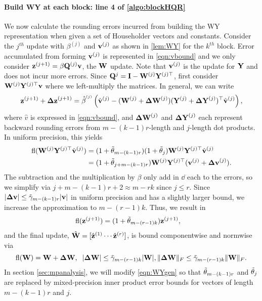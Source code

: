 \paragraph{Build WY at each block: line 4 of \cref{algo:blockHQR}}
We now calculate the rounding errors incurred from building the WY representation when given a set of Householder vectors and constants. 
Consider the $j^{th}$ update with $\beta^{(j)}$ and $\mathbf{v}^{(j)}$ as shown in \cref{lem:WY} for the $k^{th}$ block.
Error accumulated from forming $\mathbf{v}^{(j)}$ is represented in \cref{eqn:vbound} and we only consider $\mathbf{z}^{(j+1)} =\beta\mathbf{Q}^{(j)}\mathbf{v}$, the $
\mathbf{W}$ update.
Note that $\mathbf{v}^{(j)}$ is the update for $\mathbf{Y}$ and does not incur more errors. 
Since $\mathbf{Q}^{j} = \mathbf{I} - \mathbf{W}^{(j)}\mathbf{Y}^{(j)\top}$, first consider $\mathbf{W}^{(j)}\mathbf{Y}^{(j)\top}\mathbf{v}$ where we left-multiply the matrices.
In general, we can write
\begin{equation*}
\mathbf{z}^{(j+1)} + \mathbf{\Delta z}^{(j+1)} = \hat{\beta}^{^{(j)}}\left( \hat{\mathbf{v}}^{(j)} - (\mathbf{W}^{(j)} + \mathbf{\Delta W}^{(j)})(\mathbf{Y}^{(j)}+\mathbf{\Delta Y}^{(j)})^{\top}\hat{\mathbf{v}}^{(j)}\right), 
\end{equation*}
where $\hat{v}$ is expressed in \cref{eqn:vbound}, and $\mathbf{\Delta W}^{(j)}$ and $\mathbf{\Delta Y}^{(j)}$ each represent backward rounding errors from $m-(k-1)r$-length and $j$-length dot products.
In uniform precision, this yields
\begin{align}
	\fl(\bb{W}^{(j)}\bb{Y}^{(j)\top}\hat{\bb{v}}^{(j)})&= (1+\tilde{\tth}_{m-(k-1)r})(1+\tilde{\tth}_{j})\bb{W}^{(j)}\bb{Y}^{(j)\top}\hat{\bb{v}}^{(j)} \label{eqn:WYgen}\\
	&= (1+\tilde{\tth}_{j+m-(k-1)r})\bb{W}^{(j)}\bb{Y}^{(j)\top}(\bb{v}^{(j)} +\bb{\Delta v}^{(j)}).
\end{align}
The subtraction and the multiplication by $\beta$ only add in $\dd$ each to the errors, so we simplify via $j+m-(k-1)r+2 \approx m-rk$ since $j\leq r$.
Since $|\mathbf{\Delta v}| \leq \tilde{\gamma}_{m-(k-1)r}|\mathbf{v}|$ in uniform precision and has a slightly larger bound, we increase the approximation to $m-(r-1)k$.
Thus, we result in
\begin{align*}
	\mathrm{fl}(\mathbf{z}^{(j+1)}) &= (1+\tilde{\theta}_{m-(r-1)k})\mathbf{z}^{(j+1)},
\end{align*}
and the final update, $\hat{\mathbf{W}} = [\hat{\mathbf{z}}^{(1)} \cdots \hat{\mathbf{z}}^{(r)} ]$, is bound componentwise and normwise via
\begin{equation*}
	\mathrm{fl}(\mathbf{W}) = \mathbf{W} + \mathbf{\Delta W},\;\; |\mathbf{\Delta W}| \leq \tilde{\gamma}_{m-(r-1)k}|\mathbf{W}|, \|\mathbf{\Delta W}\|_F\leq \tilde{\gamma}_{m-(r-1)k} \|\mathbf{W}\|_F.
\end{equation*}
In section \cref{sec:mpanalysis}, we will modify \cref{eqn:WYgen} so that $\tilde{\theta}_{m-(k-1)r}$ and $\tilde{\theta}_{j}$ are replaced by mixed-precision inner product error bounds for vectors of length $m-(k-1)r$ and $j$.
